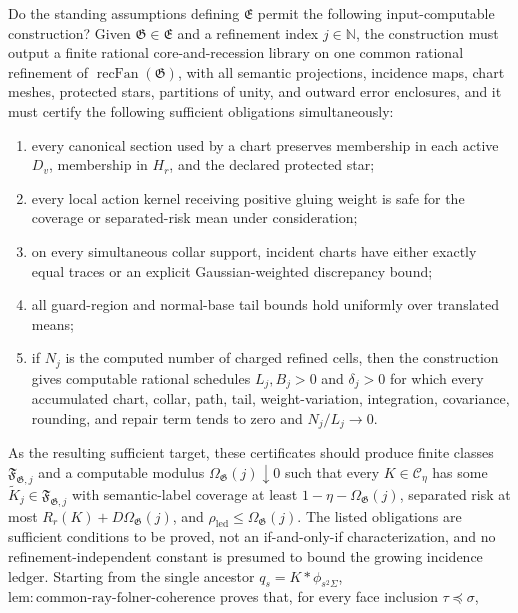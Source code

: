 Do the standing assumptions defining \(\mathfrak E\) permit the following input-computable construction?  Given \(\mathfrak G\in\mathfrak E\) and a refinement index \(j\in\mathbb N\), the construction must output a finite rational core-and-recession library on one common rational refinement of \(\operatorname{recFan}(\mathfrak G)\), with all semantic projections, incidence maps, chart meshes, protected stars, partitions of unity, and outward error enclosures, and it must certify the following sufficient obligations simultaneously:
\begin{enumerate}
\item every canonical section used by a chart preserves membership in each active \(D_v\), membership in \(H_r\), and the declared protected star;
\item every local action kernel receiving positive gluing weight is safe for the coverage or separated-risk mean under consideration;
\item on every simultaneous collar support, incident charts have either exactly equal traces or an explicit Gaussian-weighted discrepancy bound;
\item all guard-region and normal-base tail bounds hold uniformly over translated means;
\item if \(N_j\) is the computed number of charged refined cells, then the construction gives computable rational schedules \(L_j,B_j>0\) and \(\delta_j>0\) for which every accumulated chart, collar, path, tail, weight-variation, integration, covariance, rounding, and repair term tends to zero and \(N_j/L_j\to0\).
\end{enumerate}
As the resulting sufficient target, these certificates should produce finite classes \(\mathfrak F_{\mathfrak G,j}\) and a computable modulus \(\Omega_{\mathfrak G}(j)\downarrow0\) such that every \(K\in\mathcal C_\eta\) has some \(\widetilde K_j\in\mathfrak F_{\mathfrak G,j}\) with semantic-label coverage at least \(1-\eta-\Omega_{\mathfrak G}(j)\), separated risk at most \(R_r(K)+D\Omega_{\mathfrak G}(j)\), and \(\rho_{\mathrm{led}}\leq\Omega_{\mathfrak G}(j)\).  The listed obligations are sufficient conditions to be proved, not an if-and-only-if characterization, and no refinement-independent constant is presumed to bound the growing incidence ledger.
Starting from the single ancestor \(q_s=K*\phi_{s^2\Sigma}\), \(\mathrm{lem:common\mbox{-}ray\mbox{-}folner\mbox{-}coherence}\) proves that, for every face inclusion \(\tau\preceq\sigma\),
